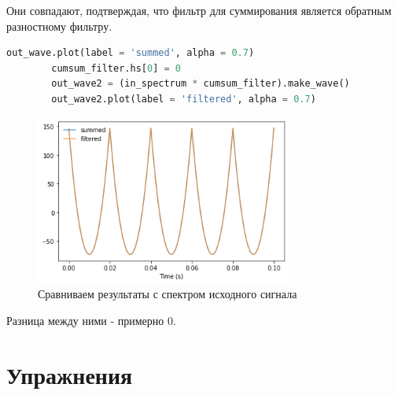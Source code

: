 \documentclass[a4paper, 12pt]{report}
\begin{document}
	Они совпадают, подтверждая, что фильтр для суммирования является обратным разностному фильтру.	
	\begin{lstlisting}[language=Python,caption=Вычисляем выходной сигнал с помощью теоремы о свертке]
		out_wave.plot(label = 'summed', alpha = 0.7)
		cumsum_filter.hs[0] = 0
		out_wave2 = (in_spectrum * cumsum_filter).make_wave()
		out_wave2.plot(label = 'filtered', alpha = 0.7)
	\end{lstlisting}
	\begin{figure}[H]
		\centering
		\includegraphics[width=0.75\textwidth]{sum8.png}
		\caption{Сравниваем результаты с спектром исходного сигнала}
		\label{fig:sum8}
	\end{figure}
	Разница между ними - примерно 0.
	
	\chapter{Упражнения}
\end{document}
